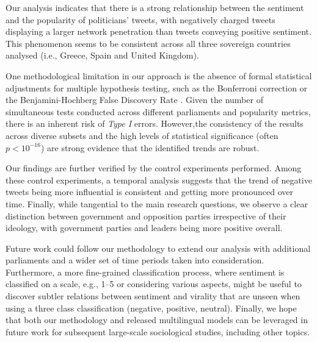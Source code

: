 Our analysis indicates that there is a strong relationship between the sentiment and the popularity of politicians' tweets, with negatively charged tweets displaying a larger network penetration than tweets conveying positive sentiment. This phenomenon seems to be consistent across all three sovereign countries analysed (i.e., Greece, Spain and United Kingdom). %

One methodological limitation in our approach is the absence of formal statistical adjustments for multiple hypothesis testing, such as the Bonferroni correction \cite{dunn1961multiple} or the Benjamini-Hochberg False Discovery Rate \cite{benjamini1995controlling}. Given the number of simultaneous tests conducted across different parliaments and popularity metrics, there is an inherent risk of \textit{Type I} errors. However,the consistency of the results across diverse subsets and the high levels of statistical significance (often $p < 10^{-16}$) are strong evidence that the identified trends are robust.

Our findings are further verified by the control experiments performed. 
Among these control experiments, a temporal analysis suggests that the trend of negative tweets being more influential is consistent and getting more pronounced over time. Finally, while tangential to the main research questions, we observe a clear distinction between government and opposition parties irrespective of their ideology, with government parties and leaders being more positive overall.


Future work could follow our methodology to extend our analysis with additional parliaments and a wider set of time periods taken into consideration. Furthermore, a more fine-grained classification process, where sentiment is classified on a scale, e.g., 1--5 or considering various aspects, might be useful to discover subtler relations between sentiment and virality that are unseen when using a three class classification (negative, positive, neutral). Finally, we hope that both our methodology and released multilingual models can be leveraged in future work for subsequent large-scale sociological studies, including other topics.


